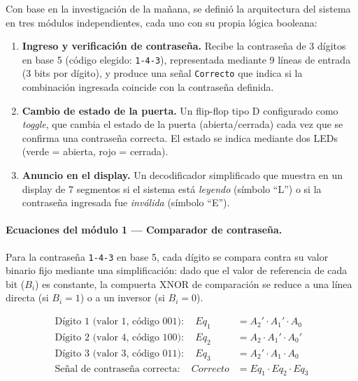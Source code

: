 \documentclass[11pt]{article}
\begin{document}
Con base en la investigación de la mañana, se definió la arquitectura del
sistema en tres módulos independientes, cada uno con su propia lógica
booleana:

\begin{enumerate}
    \item \textbf{Ingreso y verificación de contraseña.} Recibe la
    contraseña de 3 dígitos en base 5 (código elegido: \texttt{1-4-3}),
    representada mediante 9 líneas de entrada (3 bits por dígito), y
    produce una señal \texttt{Correcto} que indica si la combinación
    ingresada coincide con la contraseña definida.

    \item \textbf{Cambio de estado de la puerta.} Un flip-flop tipo D
    configurado como \emph{toggle}, que cambia el estado de la puerta
    (abierta/cerrada) cada vez que se confirma una contraseña correcta. El
    estado se indica mediante dos LEDs (verde = abierta, rojo = cerrada).

    \item \textbf{Anuncio en el display.} Un decodificador simplificado
    que muestra en un display de 7 segmentos si el sistema está
    \emph{leyendo} (símbolo ``L'') o si la contraseña ingresada fue
    \emph{inválida} (símbolo ``E'').
\end{enumerate}

\paragraph{Ecuaciones del módulo 1 --- Comparador de contraseña.}

Para la contraseña \texttt{1-4-3} en base 5, cada dígito se compara contra
su valor binario fijo mediante una simplificación: dado que el valor de
referencia de cada bit ($B_i$) es constante, la compuerta XNOR de
comparación se reduce a una línea directa (si $B_i=1$) o a un inversor (si
$B_i=0$).

\begin{align*}
\text{Dígito 1 (valor 1, código 001)}: \quad Eq_1 &= A_2' \cdot A_1' \cdot A_0 \\
\text{Dígito 2 (valor 4, código 100)}: \quad Eq_2 &= A_2 \cdot A_1' \cdot A_0' \\
\text{Dígito 3 (valor 3, código 011)}: \quad Eq_3 &= A_2' \cdot A_1 \cdot A_0 \\[4pt]
\text{Señal de contraseña correcta}: \quad Correcto &= Eq_1 \cdot Eq_2 \cdot Eq_3
\end{align*}
\end{document}
